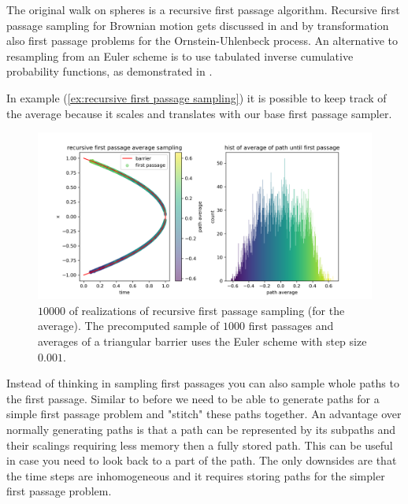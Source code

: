 \documentclass[a4paper,12pt]{article}
\begin{document}
\begin{related}
    The original walk on spheres is a recursive first passage algorithm.
    Recursive first passage sampling for
    Brownian motion gets discussed in \cite{herrmann_first-passage_2016}
    and by transformation also first passage problems for the
    Ornstein-Uhlenbeck process.
    An alternative to resampling from an Euler scheme is to use tabulated
    inverse cumulative probability functions,
    as demonstrated in \cite{hwang_simulationtabulation_2001}.
\end{related}



\begin{example} \label{ex:recu FP average}
    In example (\ref{ex:recursive first passage sampling}) it is possible to keep
    track of the average because it scales and translates with our base first passage sampler.

    \begin{figure}[ht!]
        \centering
        \includegraphics[width=1\textwidth]{plots/recursive first passage average para.png}
        \caption{ $10000$ of realizations of recursive first passage sampling (for the average).
            The precomputed sample of $1000$ first passages and averages of a triangular barrier
            uses the Euler scheme with step size $0.001$.}
        \label{fig:recursive first passage average para}
    \end{figure}
\end{example}


\begin{technique}
    Instead of thinking in sampling first passages  you can also sample
    whole paths to the first passage. Similar to before we need to be
    able to generate paths for a simple first passage problem and "stitch"
    these paths together. An advantage over normally generating paths
    is that a path can be represented by its subpaths and their scalings
    requiring less memory then a fully stored path. This can be useful
    in case you need to look back to a part of the path.
    The only downsides are that the time steps are inhomogeneous
    and it requires storing paths for the simpler first passage problem.
\end{technique}
\end{document}
